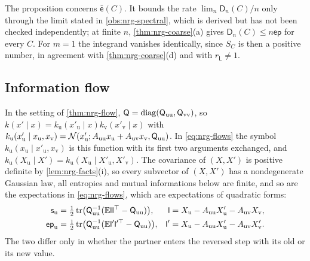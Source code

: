 The proposition concerns $\bar{\mathsf e}(C)$. It bounds the rate $\lim_n\mathsf D_n(C)/n$ only through the limit stated in \cref{obs:nrg-spectral}, which is derived but has not been checked independently; at finite $n$, \cref{thm:nrg-coarse}(a) gives $\mathsf D_n(C)\le n\mathsf{ep}$ for every $C$. For $m=1$ the integrand vanishes identically, since $S_C$ is then a positive number, in agreement with \cref{thm:nrg-coarse}(d) and with $r_{\mathsf L}\ne1$.

\subsection*{Information flow}

In the setting of \cref{thm:nrg-flow}, $\mathsf Q=\operatorname{diag}(\mathsf Q_{\mathrm{uu}},\mathsf Q_{\mathrm{vv}})$, so $k(x'\mid x)=k_{\mathrm u}(x'_{\mathrm u}\mid x)k_{\mathrm v}(x'_{\mathrm v}\mid x)$ with $k_{\mathrm u}(x'_{\mathrm u}\mid x_{\mathrm u},x_{\mathrm v})=\mathcal{N}(x'_{\mathrm u};A_{\mathrm{uu}}x_{\mathrm u}+A_{\mathrm{uv}}x_{\mathrm v},\mathsf Q_{\mathrm{uu}})$. In \cref{eq:nrg-flows} the symbol $k_{\mathrm u}(x_{\mathrm u}\mid x'_{\mathrm u},x_{\mathrm v})$ is this function with its first two arguments exchanged, and $k_{\mathrm u}(X_{\mathrm u}\mid X')=k_{\mathrm u}(X_{\mathrm u}\mid X'_{\mathrm u},X'_{\mathrm v})$. The covariance of $(X,X')$ is positive definite by \cref{lem:nrg-facts}(i), so every subvector of $(X,X')$ has a nondegenerate Gaussian law, all entropies and mutual informations below are finite, and so are the expectations in \cref{eq:nrg-flows}, which are expectations of quadratic forms:
\begin{equation}\label{eq:nrg-flows-explicit}
\begin{aligned}
\mathsf s_{\mathrm u}&=\tfrac12\operatorname{tr}\bigl(\mathsf Q_{\mathrm{uu}}^{-1}(\mathbb{E}\mathsf l\mathsf l^\top-\mathsf Q_{\mathrm{uu}})\bigr),&\mathsf l&=X_{\mathrm u}-A_{\mathrm{uu}}X'_{\mathrm u}-A_{\mathrm{uv}}X_{\mathrm v},\\
\mathsf{ep}_{\mathrm u}&=\tfrac12\operatorname{tr}\bigl(\mathsf Q_{\mathrm{uu}}^{-1}(\mathbb{E}\mathsf l'\mathsf l'^\top-\mathsf Q_{\mathrm{uu}})\bigr),&\mathsf l'&=X_{\mathrm u}-A_{\mathrm{uu}}X'_{\mathrm u}-A_{\mathrm{uv}}X'_{\mathrm v}.
\end{aligned}
\end{equation}
The two differ only in whether the partner enters the reversed step with its old or its new value.

